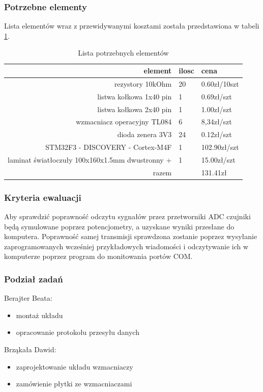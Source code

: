 \documentclass{article}
\begin{document}
\subsubsection{Potrzebne elementy}

Lista elementów wraz z przewidywanymi kosztami została przedstawiona w tabeli \ref{tab:interfejs}.
\begin{table}[th!]
\centering
\caption{ Lista potrzebnych elementów}

\begin{tabular}{|r|l|l|} \hline

element & ilosc & cena\\ \hline
rezystory 10kOhm & 20 & 0.60zł/10szt \\
listwa kołkowa 1x40 pin & 1 & 0.69zł/szt \\
listwa kołkowa 2x40 pin & 1 & 1.00zł/szt \\
wzmacniacz operacyjny TL084 & 6 & 8,34zł/szt \\
dioda zenera 3V3 & 24 & 0.12zł/szt \\
STM32F3 - DISCOVERY - Cortex-M4F & 1 & 102.90zł/szt \\
laminat światłoczuły 100x160x1.5mm dwustronny + & 1 & 15.00zł/szt \\\hline %
razem & & 131.41zł \\\hline
\end{tabular}
\label{tab:interfejs}
\end{table}


\subsubsection{Kryteria ewaluacji}
Aby sprawdzić poprawność odczytu sygnałów przez przetworniki ADC czujniki będą symulowane poprzez potencjometry, a uzyskane wyniki przesłane do komputera. Poprawność samej transmisji sprawdzona zostanie poprzez wysyłanie zaprogramowanych wcześniej przykładowych wiadomości i odczytywanie ich w komputerze poprzez program do monitowania portów COM.

\subsubsection{Podział zadań}
Berajter Beata:
\begin{itemize}
    \item montaż układu
    \item opracowanie protokołu przesyłu danych
\end{itemize}
Brząkała Dawid:
\begin{itemize}
    \item zaprojektowanie układu wzmacniaczy
    \item zamówienie płytki ze wzmacniaczami
\end{itemize}
\end{document}
